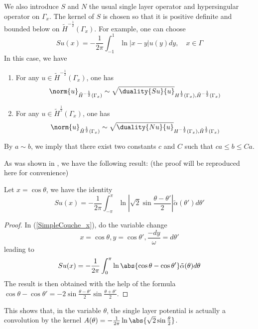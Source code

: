 \documentclass[11pt,a4paper]{article}
\begin{document}
	We also introduce $S$ and $N$ the usual single layer operator and hypersingular operator on $\Gamma_x$.   The kernel of $S$ is chosen so that it is positive definite and bounded below on  $\tilde{H}^{-\frac{1}{2}}(\Gamma_x)$. For example, one can choose 
	\begin{equation}
		Su(x) = -\frac{1}{2\pi}\int_{-1}^{1} \ln |x-y|u(y)dy,\quad x \in \Gamma
		\label{SimpleCouche_x}
	\end{equation}
	In this case, we have
	\begin{Lem}
		\text{ }
		\begin{enumerate}
			\item For any $u \in \tilde{H}^{-\frac{1}{2}}(\Gamma_x)$, one has 
			\[ \norm{u}_{\tilde{H}^{-\frac{1}{2}}(\Gamma_x)} \sim \sqrt{\duality{Su}{u}}_{H^{\frac{1}{2}}(\Gamma_x),\tilde{H}^{-\frac{1}{2}}(\Gamma_x)}\]		
			\item For any $u \in \tilde{H}^{\frac{1}{2}}(\Gamma_x)$, one has
			\[\norm{u}_{\tilde{H}^\frac{1}{2}(\Gamma_x)} \sim \sqrt{\duality{Nu}{u}}_{H^{-\frac{1}{2}}(\Gamma_x),\tilde{H}^{\frac{1}{2}}(\Gamma_x)}\]
		\end{enumerate}		
	\end{Lem}
	By $a \sim b$, we imply that there exist two constants $c$ and $C$ such that $ca \leq b \leq Ca$. 
	
	As was shown in \cite{yan1988integral}, we have the following result: (the proof will be reproduced here for convenience)
	\begin{Prop} \label{FormuleSImpleCoucheConvol}
		Let $x = \cos\theta$, we have the identity
		\begin{equation}
			Su(x) = -\frac{1}{2\pi}\int_{-\pi}^{\pi} \ln\left|\sqrt{2}\sin \frac{\theta - \theta'}{2}\right| \tilde{\alpha}(\theta')d\theta'
		\end{equation}
		\begin{proof}
			In (\ref{SimpleCouche_x}), do the variable change 
			\begin{equation}
			x = \cos\theta, y = \cos\theta', \frac{-dy}{\omega} = d\theta'
			\end{equation}
			leading to 
			\begin{equation*}
				Su(x) = -\frac{1}{2\pi}\int_{0}^\pi \ln\abs{\cos\theta - \cos\theta'} \tilde{\alpha}(\theta)d\theta
			\end{equation*}
			The result is then obtained with the help of the formula $\cos\theta - \cos\theta' = -2\sin\frac{\theta - \theta'}{2} \sin\frac{\theta + \theta'}{2}$. 
		\end{proof}
	\end{Prop}
	\begin{Rem}
		This shows that, in the variable $\theta$, the single layer potential is actually a convolution by the kernel $A(\theta) = -\frac{1}{2\pi}\ln \abs{\sqrt{2}\sin\frac{\theta}{2}}$. 
	\end{Rem}
	
\end{document}
